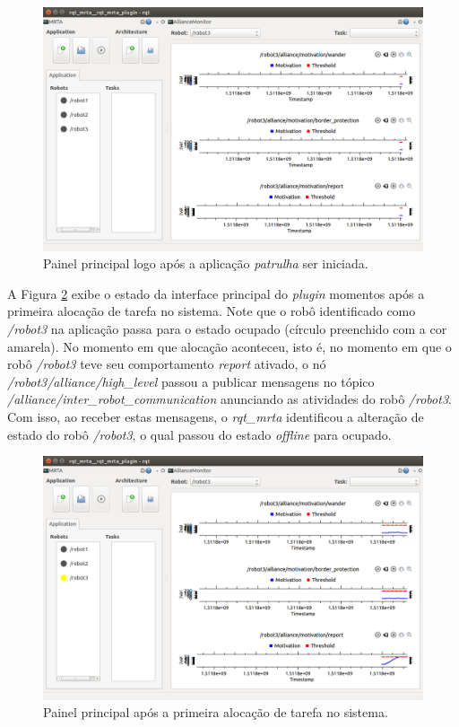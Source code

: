             \begin{figure}[htb]
                \centering
                \includegraphics[width=.75\textwidth]{Figuras/4_resultados/rqt_mrta2.png}
                \caption{Painel principal logo após a aplicação \textit{patrulha} ser iniciada.} \label{fig:rqt_mrta2}
            \end{figure}
            
            A Figura \ref{fig:rqt_mrta3} exibe o estado da interface principal do \textit{plugin} momentos após a primeira alocação de tarefa no sistema. Note que o robô identificado como \textit{/robot3} na aplicação passa para o estado ocupado (círculo preenchido com a cor amarela). No momento em que alocação aconteceu, isto é, no momento em que o robô \textit{/robot3} teve seu comportamento \textit{report} ativado, o nó \textit{/robot3/alliance/high\_level} passou a publicar mensagens no tópico \textit{/alliance/inter\_robot\_communication} anunciando as atividades do robô \textit{/robot3}. Com isso, ao receber estas mensagens, o \textit{rqt\_mrta} identificou a alteração de estado do robô \textit{/robot3}, o qual passou do estado \textit{offline} para ocupado.
        
            \begin{figure}[htb]
                \centering
                \includegraphics[width=.75\textwidth]{Figuras/4_resultados/rqt_mrta3.png}
                \caption{Painel principal após a primeira alocação de tarefa no sistema.} \label{fig:rqt_mrta3}
            \end{figure}
            
